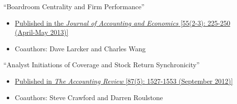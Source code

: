 \pagebreak[0]
\begin{samepage}
\item ``Boardroom Centrality and Firm Performance''
\begin{itemize}
\vspace*{-.07in}
	\item \href{https://doi.org/10.1016/j.jacceco.2013.01.006}{Published in the {\it Journal of Accounting and Economics} [55(2-3): 225-250 (April-May 2013)]}
\vspace*{-.07in}
	\item Coauthors: Dave Larcker and Charles Wang
\end{itemize}
\end{samepage}

\vskip 0.08cm



\pagebreak[0]
\begin{samepage}
\item ``Analyst Initiations of Coverage and Stock Return Synchronicity''
\begin{itemize}
\vspace*{-.07in}
	\item \href{https://doi.org/10.2308/accr-50186}{Published in {\it The Accounting Review} [87(5): 1527-1553 (September 2012)]}
\vspace*{-.07in}
	\item Coauthors: Steve Crawford and Darren Roulstone
\end{itemize}
\end{samepage}

